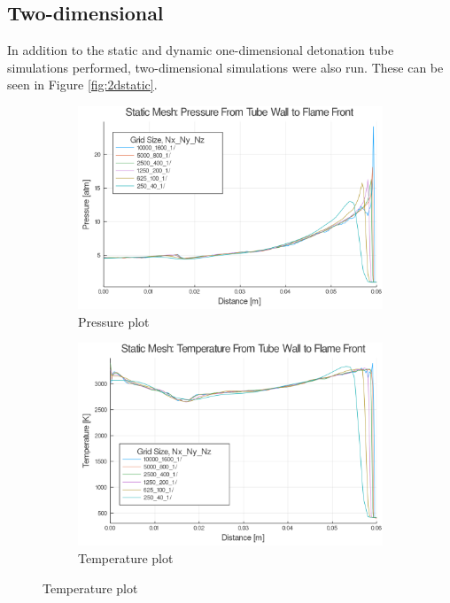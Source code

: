 \subsection{Two-dimensional}
In addition to the static and dynamic one-dimensional detonation tube simulations performed, two-dimensional simulations were also run. These can be seen in Figure \ref{fig:2dstatic}. 
\begin{figure}[]
    \centering
    \begin{subfigure}[]{\textwidth}
        \centering
        \includegraphics[width=\textwidth]{./figs/staticfigs/p.png}
        \caption{Pressure plot}
        \label{fig:2dstaticp}
    \end{subfigure}

    \begin{subfigure}[]{\textwidth}
        \centering
        \includegraphics[width=\textwidth]{./figs/staticfigs/t.png}
        \caption{Temperature plot}
    \end{subfigure}

\end{figure}
